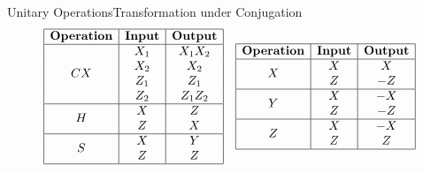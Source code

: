 \begin{frame}{Unitary Operations}{Transformation under Conjugation}
    \[
        \renewcommand{\arraystretch}{1.0}
        \begin{array}{|c|c|c|}
            \hline
            \textbf{Operation}      & \textbf{Input} & \textbf{Output} \\
            \hline
            \multirow{4}{*}{\(CX\)} & X_1            & X_1 X_2         \\
            & X_2            & X_2             \\
            & Z_1            & Z_1             \\
            & Z_2            & Z_1 Z_2         \\
            \hline
            \multirow{2}{*}{\(H\)}  & X              & Z               \\
            & Z              & X               \\
            \hline
            \multirow{2}{*}{\(S\)}  & X              & Y               \\
            & Z              & Z               \\
            \hline
        \end{array}
        \quad
        \begin{array}{|c|c|c|}
            \hline
            \textbf{Operation}     & \textbf{Input} & \textbf{Output} \\
            \hline
            \multirow{2}{*}{\(X\)} & X              & X               \\
            & Z              & -Z              \\
            \hline
            \multirow{2}{*}{\(Y\)} & X              & -X              \\
            & Z              & -Z              \\
            \hline
            \multirow{2}{*}{\(Z\)} & X              & -X              \\
            & Z              & Z               \\
            \hline
        \end{array}
    \]

    \vspace*{5mm}

\end{frame}